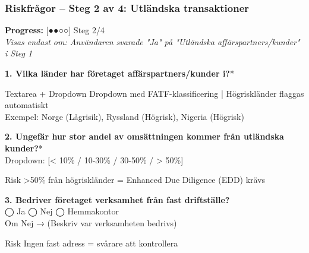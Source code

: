 \documentclass[10pt]{beamer}
\begin{document}



\begin{frame}[label=riskfragor-steg2]
  \frametitle{Riskfrågor – Steg 2 av 4: Utländska transaktioner}

  \begin{center}
    \textbf{Progress:} [●●○○] Steg 2/4\\
    \tiny \textit{Visas endast om: Användaren svarade "Ja" på "Utländska affärspartners/kunder" i Steg 1}
  \end{center}

  \vspace{0.5cm}

  \footnotesize

  \textbf{1. Vilka länder har företaget affärspartners/kunder i?}*
  \begin{block}{Textarea + Dropdown}
    \tiny Dropdown med FATF-klassificering | Högriskländer flaggas automatiskt\\
    Exempel: Norge (Lågrisik), Ryssland (Högrisk), Nigeria (Högrisk)
  \end{block}

  \vspace{0.3cm}

  \textbf{2. Ungefär hur stor andel av omsättningen kommer från utländska kunder?}*\\
  Dropdown: [< 10\% / 10-30\% / 30-50\% / > 50\%]
  \begin{block}{Risk}
    \tiny >50\% från högriskländer = Enhanced Due Diligence (EDD) krävs
  \end{block}

  \vspace{0.3cm}

  \textbf{3. Bedriver företaget verksamhet från fast driftställe?}\\
  ◯ Ja \hspace{0.3cm} ◯ Nej \hspace{0.3cm} ◯ Hemmakontor\\
  Om Nej → \underline{\hspace{6cm}} (Beskriv var verksamheten bedrivs)
  \begin{block}{Risk}
    \tiny Ingen fast adress = svårare att kontrollera
  \end{block}


\end{frame}
\end{document}
